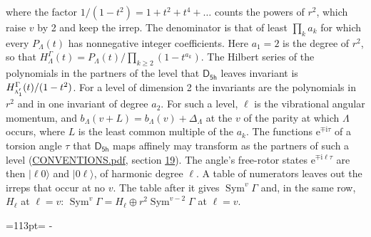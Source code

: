 \documentclass[10pt,a4paper]{article}
\newcommand{\needspace}[1]{\par\penalty-100\begingroup\dimen0=#1\relax\dimen2=\pagegoal
  \advance\dimen2-\pagetotal\ifdim\dimen0>\dimen2\relax\ifdim\dimen2>0pt\vfil\break\fi\fi
  \endgroup}
\numberwithin{equation}{section}
\newcommand{\grp}[1]{\mathsf{#1}}
\newcommand{\irr}[1]{\text{\normalfont\scshape #1}}
\newcommand{\iunit}{\mathrm{i}}
\newcommand{\expe}{\mathrm{e}}
\newcommand{\occ}[1]{\lvert #1\rangle}
\begin{document}
where the factor $1/(1 - t^2) = 1 + t^2 + t^4 + \dots$ counts the powers of $r^2$, which raise $v$ by 2 and keep the irrep. The denominator is that of least $\prod_k a_k$ for which every $P_\Lambda(t)$ has nonnegative integer coefficients. Here $a_1 = 2$ is the degree of $r^2$, so that $H^{\Gamma}_\Lambda(t) = P_\Lambda(t)/\prod_{k\ge2}(1 - t^{a_k})$. The Hilbert series of the polynomials in the partners of the level that $\grp{D_{5h}}$ leaves invariant is $H^{\Gamma}_{\irr{a}_{1}'}(t)/(1 - t^2)$. For a level of dimension 2 the invariants are the polynomials in $r^2$ and in one invariant of degree $a_2$. \label{n:index.overtone.period}\label{n:index.increment.unitary}For such a level, $\ell$ is the vibrational angular momentum, and $b_\Lambda(v + L) = b_\Lambda(v) + \Delta_\Lambda$ at the $v$ of the parity at which $\Lambda$ occurs, where $L$ is the least common multiple of the $a_k$. \label{n:local.torsion.angle}The functions $\expe^{\mp\iunit\tau}$ of a torsion angle $\tau$ that $\grp{D_{5h}}$ maps affinely may transform as the partners of such a level (\href{../../CONVENTIONS.pdf}{CONVENTIONS.pdf}, section \href{../../CONVENTIONS.pdf\#conv.19}{19}). The angle's free-rotor states $\expe^{\mp\iunit\ell\tau}$ are then $\occ{\ell 0}$ and $\occ{0 \ell}$, of harmonic degree $\ell$. A table of numerators leaves out the irreps that occur at no $v$. The table after it gives $\operatorname{Sym}^{v}\Gamma$ and, in the same row, $H_\ell$ at $\ell = v$: $\operatorname{Sym}^{v}\Gamma = H_\ell \oplus r^2\operatorname{Sym}^{v-2}\Gamma$ at $\ell = v$.
\needspace{113pt}
\end{document}
